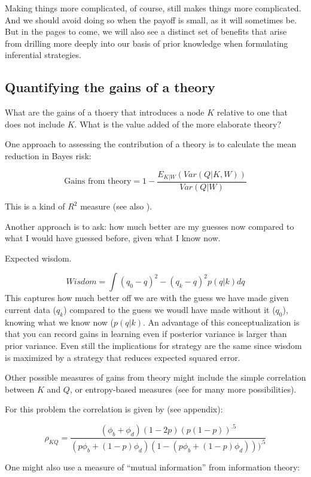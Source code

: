 \documentclass[12pt,]{book}
\begin{document}
Making things more complicated, of course, still makes things more complicated. And we should avoid doing so when the payoff is small, as it will sometimes be. But in the pages to come, we will also see a distinct set of benefits that arise from drilling more deeply into our basis of prior knowledge when formulating inferential strategies.

\hypertarget{quantifying-the-gains-of-a-theory}{%
\subsection{Quantifying the gains of a theory}\label{quantifying-the-gains-of-a-theory}}

What are the gains of a thoery that introduces a node \(K\) relative to one that does not include \(K\). What is the value added of the more elaborate theory?

One approach to assessing the contribution of a theory is to calculate the mean reduction in Bayes risk:

\[\text{Gains from theory} = 1- \frac{E_{K|W}(Var(Q|K,W))}{Var(Q|W)}\]

This is a kind of \(R^2\) measure (see also \citet{gelman2006bayesian}).

Another approach is to ask: how much better are my guesses now compared to what I would have guessed before, given what I know now.

Expected wisdom.

\[Wisdom  = \int(q_0 - q)^2 - (q_k - q)^2 p(q | k)dq\]
This captures how much better off we are with the guess we have made given current data (\(q_k\)) compared to the guess we woudl have made without it (\(q_0\)), knowing what we know now (\(p(q|k)\). An advantage of this conceptualization is that you can record gains in learning even if posterior variance is larger than prior variance. Even still the implications for strategy are the same since wisdom is maximized by a strategy that reduces expected squared error.

Other possible measures of gains from theory might include the simple correlation between \(K\) and \(Q\), or entropy-based measures (see \citet{zhang2003properties} for many more possibilities).

For this problem the correlation is given by (see appendix):

\[\rho_{KQ} = \frac{(\phi_b+\phi_d)(1-2p)(p(1-p))^{.5}}{
(p\phi_b+(1-p)\phi_d)(1-(p\phi_b+(1-p)\phi_d)))^{.5}}\]

One might also use a measure of ``mutual information'' from information theory:
\end{document}
